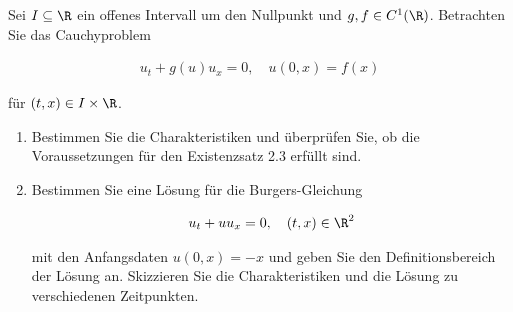 
\begin{exercise}

Sei $I \subseteq \R$ ein offenes Intervall um den Nullpunkt und $g, f \in C^1(\R)$.
Betrachten Sie das Cauchyproblem

\begin{align*}
    u_t + g(u) u_x = 0,
    \quad
    u(0, x) = f(x)
\end{align*}

für $(t, x) \in I \times \R$.

\begin{enumerate}[label = (\roman*)]

    \item Bestimmen Sie die Charakteristiken und überprüfen Sie, ob die Voraussetzungen für den Existenzsatz 2.3 erfüllt sind.

    \item Bestimmen Sie eine Lösung für die Burgers-Gleichung
    
    \begin{align*}
        u_t + u u_x = 0,
        \quad
        (t, x) \in \R^2
    \end{align*}

    mit den Anfangsdaten $u(0, x) = -x$ und geben Sie den Definitionsbereich der Lösung an.
    Skizzieren Sie die Charakteristiken und die Lösung zu verschiedenen Zeitpunkten.

\end{enumerate}

\end{exercise}


